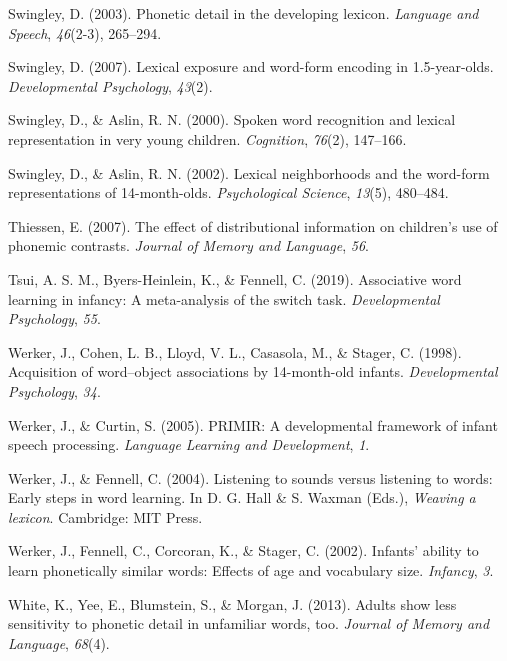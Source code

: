 \documentclass[english,,man]{apa6}
\begin{document}
\leavevmode\hypertarget{ref-swingley2003}{}%
Swingley, D. (2003). Phonetic detail in the developing lexicon. \emph{Language and Speech}, \emph{46}(2-3), 265--294.

\leavevmode\hypertarget{ref-swingley2007}{}%
Swingley, D. (2007). Lexical exposure and word-form encoding in 1.5-year-olds. \emph{Developmental Psychology}, \emph{43}(2).

\leavevmode\hypertarget{ref-swingley2000}{}%
Swingley, D., \& Aslin, R. N. (2000). Spoken word recognition and lexical representation in very young children. \emph{Cognition}, \emph{76}(2), 147--166.

\leavevmode\hypertarget{ref-swingley2002}{}%
Swingley, D., \& Aslin, R. N. (2002). Lexical neighborhoods and the word-form representations of 14-month-olds. \emph{Psychological Science}, \emph{13}(5), 480--484.

\leavevmode\hypertarget{ref-thiessen2007}{}%
Thiessen, E. (2007). The effect of distributional information on children's use of phonemic contrasts. \emph{Journal of Memory and Language}, \emph{56}.

\leavevmode\hypertarget{ref-tsui2019}{}%
Tsui, A. S. M., Byers-Heinlein, K., \& Fennell, C. (2019). Associative word learning in infancy: A meta-analysis of the switch task. \emph{Developmental Psychology}, \emph{55}.

\leavevmode\hypertarget{ref-werker1998}{}%
Werker, J., Cohen, L. B., Lloyd, V. L., Casasola, M., \& Stager, C. (1998). Acquisition of word--object associations by 14-month-old infants. \emph{Developmental Psychology}, \emph{34}.

\leavevmode\hypertarget{ref-werker2005}{}%
Werker, J., \& Curtin, S. (2005). PRIMIR: A developmental framework of infant speech processing. \emph{Language Learning and Development}, \emph{1}.

\leavevmode\hypertarget{ref-werker2004}{}%
Werker, J., \& Fennell, C. (2004). Listening to sounds versus listening to words: Early steps in word learning. In D. G. Hall \& S. Waxman (Eds.), \emph{Weaving a lexicon}. Cambridge: MIT Press.

\leavevmode\hypertarget{ref-werker2002}{}%
Werker, J., Fennell, C., Corcoran, K., \& Stager, C. (2002). Infants' ability to learn phonetically similar words: Effects of age and vocabulary size. \emph{Infancy}, \emph{3}.

\leavevmode\hypertarget{ref-white2013}{}%
White, K., Yee, E., Blumstein, S., \& Morgan, J. (2013). Adults show less sensitivity to phonetic detail in unfamiliar words, too. \emph{Journal of Memory and Language}, \emph{68}(4).
\end{document}
